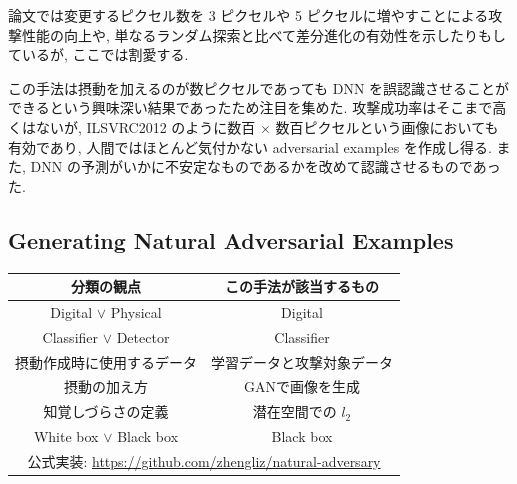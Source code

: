 論文では変更するピクセル数を 3 ピクセルや 5 ピクセルに増やすことによる攻撃性能の向上や, 単なるランダム探索と比べて差分進化の有効性を示したりもしているが, ここでは割愛する.

この手法は摂動を加えるのが数ピクセルであっても DNN を誤認識させることができるという興味深い結果であったため注目を集めた.
攻撃成功率はそこまで高くはないが, ILSVRC2012 のように数百 $\times$ 数百ピクセルという画像においても有効であり, 人間ではほとんど気付かない adversarial examples を作成し得る.
また, DNN の予測がいかに不安定なものであるかを改めて認識させるものであった.



\subsection{Generating Natural Adversarial Examples}
\label{subsec:generating-natual}

\begin{table}[htbp]
\begin{center}
\begin{tabular}{|c|c|}
\hline
分類の観点 & この手法が該当するもの \\
\hline
Digital $\lor$ Physical & Digital \\
Classifier $\lor$ Detector & Classifier \\
摂動作成時に使用するデータ & 学習データと攻撃対象データ \\
摂動の加え方 & GANで画像を生成 \\
知覚しづらさの定義 & 潜在空間での $l_2$ \\
White box $\lor$ Black box & Black box \\
\hline
\multicolumn{2}{|c|}{公式実装: \href{https://github.com/zhengliz/natural-adversary}{https://github.com/zhengliz/natural-adversary}} \\
\hline
\end{tabular}
\label{tb:generating-natual-summary}
\end{center}
\end{table}

